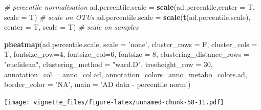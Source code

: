 \documentclass[]{book}
\newenvironment{Shaded}{\begin{snugshade}}{\end{snugshade}}
\newcommand{\KeywordTok}[1]{\textcolor[rgb]{0.13,0.29,0.53}{\textbf{#1}}}
\newcommand{\DataTypeTok}[1]{\textcolor[rgb]{0.13,0.29,0.53}{#1}}
\newcommand{\DecValTok}[1]{\textcolor[rgb]{0.00,0.00,0.81}{#1}}
\newcommand{\StringTok}[1]{\textcolor[rgb]{0.31,0.60,0.02}{#1}}
\newcommand{\CommentTok}[1]{\textcolor[rgb]{0.56,0.35,0.01}{\textit{#1}}}
\newcommand{\NormalTok}[1]{#1}
\begin{document}
\begin{Shaded}
\begin{Highlighting}[]
\CommentTok{# percentile normalisation}
\NormalTok{ad.percentile.scale =}\StringTok{ }\KeywordTok{scale}\NormalTok{(ad.percentile,}\DataTypeTok{center =}\NormalTok{ T, }\DataTypeTok{scale =}\NormalTok{ T) }\CommentTok{# scale on OTUs}
\NormalTok{ad.percentile.scale =}\StringTok{ }\KeywordTok{scale}\NormalTok{(}\KeywordTok{t}\NormalTok{(ad.percentile.scale), }\DataTypeTok{center =}\NormalTok{ T, }\DataTypeTok{scale =}\NormalTok{ T) }\CommentTok{# scale on samples}

\KeywordTok{pheatmap}\NormalTok{(ad.percentile.scale, }
         \DataTypeTok{scale =} \StringTok{'none'}\NormalTok{, }
         \DataTypeTok{cluster_rows =}\NormalTok{ F, }
         \DataTypeTok{cluster_cols =}\NormalTok{ T, }
         \DataTypeTok{fontsize_row=}\DecValTok{4}\NormalTok{, }\DataTypeTok{fontsize_col=}\DecValTok{6}\NormalTok{,}
         \DataTypeTok{fontsize =} \DecValTok{8}\NormalTok{,}
         \DataTypeTok{clustering_distance_rows =} \StringTok{"euclidean"}\NormalTok{,}
         \DataTypeTok{clustering_method =} \StringTok{"ward.D"}\NormalTok{,}
         \DataTypeTok{treeheight_row =} \DecValTok{30}\NormalTok{,}
         \DataTypeTok{annotation_col =}\NormalTok{ anno_col.ad,}
         \DataTypeTok{annotation_colors=}\NormalTok{anno_metabo_colors.ad,}
         \DataTypeTok{border_color =} \StringTok{'NA'}\NormalTok{,}
         \DataTypeTok{main =} \StringTok{'AD data - percentile norm'}\NormalTok{)}
\end{Highlighting}
\end{Shaded}

\texttt{[image: vignette\_files/figure-latex/unnamed-chunk-58-11.pdf]}
\end{document}
